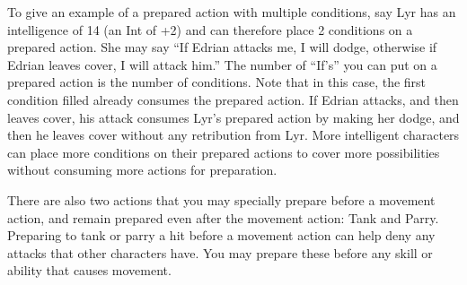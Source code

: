 To give an example of a prepared action with multiple conditions, say Lyr has an intelligence of 14 (an Int of +2) and can therefore place 2 conditions on a prepared action. She may say “If Edrian attacks me, I will dodge, otherwise if Edrian leaves cover, I will attack him.” The number of ``If's'' you can put on a prepared action is the number of conditions. Note that in this case, the first condition filled already consumes the prepared action. If Edrian attacks, and then leaves cover, his attack consumes Lyr’s prepared action by making her dodge, and then he leaves cover without any retribution from Lyr.
More intelligent characters can place more conditions on their prepared actions to cover more possibilities without consuming more actions for preparation.

There are also two actions that you may specially prepare before a movement action, and remain prepared even after the movement action: Tank and Parry. Preparing to tank or parry a hit before a movement action can help deny any attacks that other characters have. You may prepare these before any skill or ability that causes movement.

